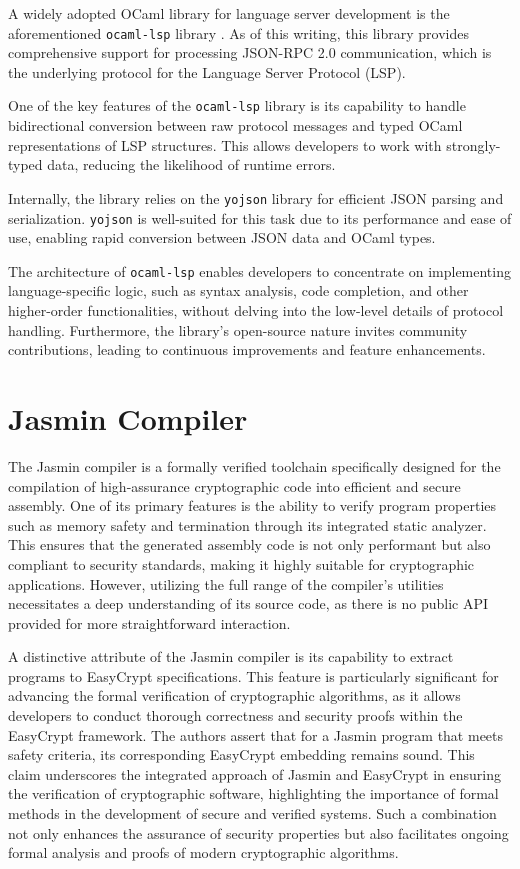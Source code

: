 A widely adopted OCaml library for language server development is the
aforementioned \texttt{ocaml-lsp} library \cite{opam-ocaml-lsp}. As of this
writing, this library provides comprehensive support for processing JSON-RPC 2.0
\cite{jsonrpc:2010} communication, which is the underlying protocol for the
Language Server Protocol (LSP). 

One of the key features of the \texttt{ocaml-lsp} library is its capability to
handle bidirectional conversion between raw protocol messages and typed OCaml
representations of LSP structures. This allows developers to work with
strongly-typed data, reducing the likelihood of runtime errors.

Internally, the library relies on the \texttt{yojson} library \cite{gh-yojson}
for efficient JSON parsing and serialization. \texttt{yojson} is well-suited for
this task due to its performance and ease of use, enabling rapid conversion
between JSON data and OCaml types. 

The architecture of \texttt{ocaml-lsp} enables developers to concentrate on
implementing language-specific logic, such as syntax analysis, code completion,
and other higher-order functionalities, without delving into the low-level
details of protocol handling. Furthermore, the library's open-source nature
invites community contributions, leading to continuous improvements and feature
enhancements.

\section{Jasmin Compiler}

The Jasmin compiler \cite{jasmin:2017} is a formally verified toolchain
specifically designed for the compilation of high-assurance cryptographic code
into efficient and secure assembly. One of its primary features is the ability
to verify program properties such as memory safety and termination through its
integrated static analyzer. This ensures that the generated assembly code is not
only performant but also compliant to security standards, making it highly
suitable for cryptographic applications. However, utilizing the full range of
the compiler's utilities necessitates a deep understanding of its source code,
as there is no public API provided for more straightforward interaction.

A distinctive attribute of the Jasmin compiler is its capability to extract
programs to EasyCrypt \cite{easycrypt:2013} specifications. This feature is
particularly significant for advancing the formal verification of cryptographic
algorithms, as it allows developers to conduct thorough correctness and security
proofs within the EasyCrypt framework. The authors assert that for a Jasmin
program that meets safety criteria, its corresponding EasyCrypt embedding
remains sound. This claim underscores the integrated approach of Jasmin and
EasyCrypt in ensuring the verification of cryptographic software, highlighting
the importance of formal methods in the development of secure and verified
systems. Such a combination not only enhances the assurance of security
properties but also facilitates ongoing formal analysis and proofs of modern
cryptographic algorithms.

